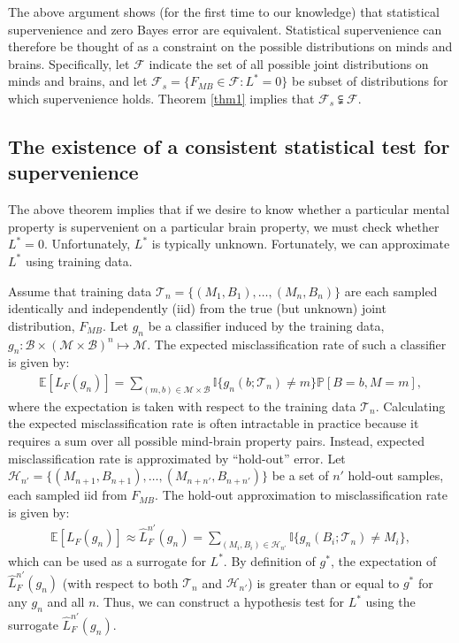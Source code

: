 \documentclass{article}
\newcommand{\mB}{\mathcal{B}}
\newcommand{\mM}{\mathcal{M}}
\newcommand{\PP}{\mathbb{P}}           %
\newcommand{\EE}{\mathbb{E}}           %
\newcommand{\II}{\mathbb{I}}           %
\providecommand{\mc}[1]{\mathcal{#1}}
\newcommand{\hL}{\widehat{L}}
\begin{document}
The above argument shows (for the first time to our knowledge) that statistical supervenience and zero Bayes error are equivalent. Statistical supervenience can therefore be thought of as a constraint on the possible distributions on minds and brains.  Specifically, let $\mc{F}$ indicate the set of all possible joint distributions on minds and brains, and let $\mc{F}_s = \{F_{MB} \in \mc{F}: L^*=0\}$ be subset of distributions for which supervenience holds. Theorem \ref{thm1} implies that $\mc{F}_s  \subsetneqq \mc{F}$.


\subsection*{The existence of a consistent statistical test for supervenience} %
\label{sub:subsection_name}


The above theorem implies that if we desire to know whether a particular mental property is supervenient on a particular brain property, we must check whether $L^*=0$.  Unfortunately, $L^*$ is typically unknown.  Fortunately, we can approximate $L^*$ using training data.

Assume that training data $\mc{T}_n=\{(M_{1},B_{1}), \ldots, (M_{n},B_{n})\}$ are each sampled identically and independently (iid) from the true (but unknown) joint distribution, $F_{MB}$.  Let $g_n$ be a classifier induced by the training data, $g_n:\mB \times (\mc{M} \times \mc{B})^n \mapsto \mM$.  The expected misclassification rate of such a classifier is given by:
\begin{align}
\EE[L_F(g_n)]=\sum_{(m,b)  \in \mc{M}\times \mc{B}} \II\{g_n(b; \mc{T}_n) \neq m\} \PP[B=b,M=m],
\end{align}
where the expectation is taken with respect to the training data $\mc{T}_n$. Calculating the expected misclassification rate is often intractable in practice because it requires a sum over all possible mind-brain property pairs.  Instead, expected misclassification rate is approximated by ``hold-out'' error.  Let $\mc{H}_{n'}=\{(M_{n+1},B_{n+1}), \ldots, (M_{n+n'},B_{n+n'})\}$ be a set of $n'$ hold-out samples, each sampled iid from $F_{MB}$.  The hold-out approximation to misclassification rate is given by:
\begin{align}
\EE[L_F(g_n)] \approx \hL^{n'}_{F}(g_{n}) = \sum_{(M_i,B_i) \in \mc{H}_{n'}}\II \{g_{n}(B_i; \mc{T}_{n})\neq M_i\}, %
\end{align}
which can be used as a surrogate for $L^*$. 
By definition of $g^*$, the expectation of $\hL^{n'}_F(g_n)$ (with respect to both $\mc{T}_n$ and $\mc{H}_{n'}$)  is greater than or equal to $g^*$ for any $g_n$ and all $n$.  Thus, we can construct a hypothesis test for $L^*$ using the surrogate $\hL^{n'}_F(g_n)$.  
\end{document}
